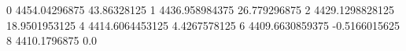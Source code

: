 0 4454.04296875 43.86328125
1 4436.958984375 26.779296875
2 4429.1298828125 18.9501953125
4 4414.6064453125 4.4267578125
6 4409.6630859375 -0.5166015625
8 4410.1796875 0.0
